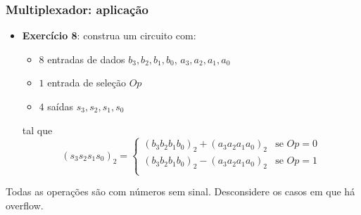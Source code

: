 \documentclass{beamer}
\begin{document}
\begin{frame}
\frametitle{Multiplexador: aplicação}

\begin{itemize}
\item \textbf{Exercício 8}: construa um circuito com:
\begin{itemize}
\item $8$ entradas de dados $b_3, b_2, b_1, b_0$, $a_3, a_2, a_1, a_0$
\item $1$ entrada de seleção $Op$
\item $4$ saídas $s_3, s_2, s_1, s_0$
\end{itemize}
tal que $$
(s_3 s_2 s_1 s_0)_2 = \left\{
\begin{array}{ll}
(b_3 b_2 b_1 b_0)_2 + (a_3 a_2 a_1 a_0)_2 & \text{se } Op = 0 \\
(b_3 b_2 b_1 b_0)_2 - (a_3 a_2 a_1 a_0)_2 & \text{se } Op = 1 \\
\end{array}
\right.
$$
\end{itemize}
Todas as operações são com números sem sinal. Desconsidere os casos em que há overflow.
\end{frame}
\end{document}

